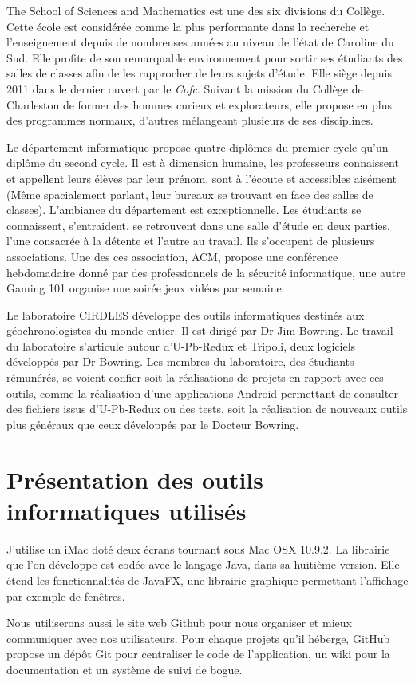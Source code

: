 The School of Sciences and Mathematics est une des six divisions du Collège. Cette école est considérée comme la plus performante dans la recherche et l’enseignement depuis de nombreuses années au niveau de l’état de Caroline du Sud. Elle profite de son remarquable environnement pour sortir ses étudiants des salles de classes afin de les rapprocher de leurs sujets d’étude. Elle siège depuis 2011 dans le dernier ouvert par le \textit{Cofc}. Suivant la mission du Collège de Charleston de former des hommes curieux et explorateurs, elle propose en plus des programmes normaux, d’autres mélangeant plusieurs de ses disciplines.

Le département informatique propose quatre diplômes du premier cycle  qu’un diplôme du second cycle. Il est à dimension humaine, les professeurs connaissent et appellent leurs élèves par leur prénom, sont à l’écoute et accessibles aisément (Même spacialement parlant, leur bureaux se trouvant en face des salles de classes).
L’ambiance du département est exceptionnelle. Les étudiants se connaissent, s’entraident, se retrouvent dans une salle d’étude en deux parties, l'une consacrée à la détente et l’autre au travail. Ils s'occupent de plusieurs associations. Une des ces association, ACM, propose une conférence hebdomadaire donné par des professionnels de la sécurité informatique, une autre Gaming 101 organise une soirée jeux vidéos par semaine.

Le laboratoire CIRDLES développe des outils informatiques destinés aux géochronologistes du monde entier. Il est dirigé par Dr Jim Bowring. Le travail du laboratoire s’articule autour d’U-Pb-Redux et Tripoli, deux logiciels développés par Dr Bowring. Les membres du laboratoire, des étudiants rémunérés, se voient confier soit la réalisations de projets en rapport avec ces outils, comme la réalisation d’une applications Android permettant de consulter des fichiers issus d’U-Pb-Redux ou des tests, soit la réalisation de nouveaux outils plus généraux que ceux développés par le Docteur Bowring.

\section{Présentation des outils informatiques utilisés}

J’utilise un iMac doté deux écrans tournant sous Mac OSX 10.9.2. La librairie que l’on développe est codée avec le langage Java, dans sa huitième version. Elle étend les fonctionnalités de JavaFX, une librairie graphique permettant l’affichage par exemple de fenêtres.

Nous utiliserons aussi le site web Github pour nous organiser et mieux communiquer avec nos utilisateurs. Pour chaque projets qu'il héberge, GitHub propose un dépôt Git pour centraliser le code de l’application, un wiki pour la documentation et un système de suivi de bogue.
